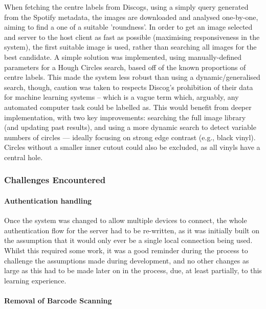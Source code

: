             When fetching the centre labels from Discogs, using a simply query generated from the Spotify metadata, the images are downloaded and analysed one-by-one, aiming to find a one of a suitable 'roundness'. In order to get an image selected and server to the host client as fast as possible (maximising responsiveness in the system), the first suitable image is used, rather than searching all images for the best candidate. A simple solution was implemented, using manually-defined parameters for a Hough Circles search, based off of the known proportions of centre labels. This made the system less robust than using a dynamic/generalised search, though, caution was taken to respects Discog's prohibition of their data for machine learning systems \cite{discogsToS} -- which is a vague term which, arguably, any automated computer task could be labelled as. This would benefit from deeper implementation, with two key improvements: searching the full image library (and updating past results), and using a more dynamic search to detect variable numbers of circles — ideally focusing on strong edge contrast (e.g., black vinyl). Circles without a smaller inner cutout could also be excluded, as all vinyls have a central hole.
    
            \subsubsection{Challenges Encountered}
    
                \paragraph{Authentication handling}
    
                Once the system was changed to allow multiple devices to connect, the whole authentication flow for the server had to be re-written, as it was initially built on the assumption that it would only ever be a single local connection being used. Whilst this required some work, it was a good reminder during the process to challenge the assumptions made during development, and no other changes as large as this had to be made later on in the process, due, at least partially, to this learning experience.
    
                \paragraph{Removal of Barcode Scanning}
    
